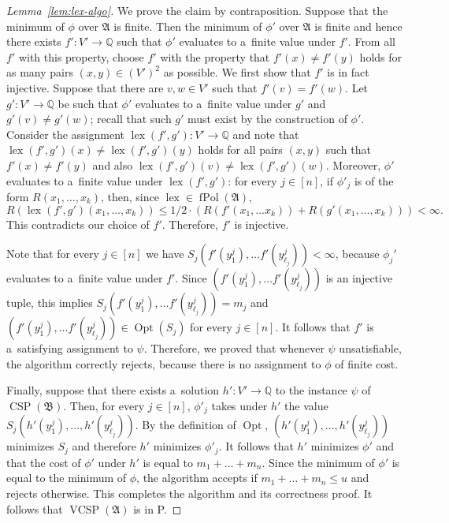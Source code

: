 \documentclass[preprint,12pt]{elsarticle}
\newcommand{\Q}{\mathbb Q}
\newcommand{\bA}{{\mathfrak A}}
\newcommand{\bB}{{\mathfrak B}}
\DeclareMathOperator{\fPol}{fPol}
\DeclareMathOperator{\vcsp}{VCSP}
\DeclareMathOperator{\CSP}{CSP}
\DeclareMathOperator{\Opt}{Opt}
\DeclareMathOperator{\lex}{lex}
\begin{document}
\begin{proof}[Lemma~\ref{lem:lex-algo}]
%
We prove the claim by contraposition. 
%
Suppose that the minimum of $\phi$ over $\bA$ is finite. Then the minimum of $\phi'$ over $\bA$ is finite and hence there exists $f' \colon V' \to \Q$ such that $\phi'$ evaluates to a~finite value under $f'$. From all $f'$ with this property, choose $f'$ with the property that $f'(x)\neq f'(y)$ holds for as many pairs $(x,y) \in (V')^2$ as possible.
%
We first show that $f'$ is in fact injective. Suppose that there are $v, w \in V'$ such that $f'(v)=f'(w)$. Let $g' \colon V' \to \Q$ be such that $\phi'$ evaluates to a~finite value under $g'$ and $g'(v) \neq g'(w)$; recall that such $g'$ must exist by the construction of $\phi'$. Consider the assignment $\lex(f',g') \colon V' \to \Q$ and note that $\lex(f',g')(x) \neq \lex(f',g')(y)$ holds for all pairs $(x,y)$ such that $f'(x) \neq f'(y)$ and also $\lex(f',g')(v) \neq \lex(f',g')(w)$. Moreover, $\phi'$ evaluates to a~finite value under $\lex(f',g')$: for every $j \in [n]$, if $\phi'_j$ is of the form $R(x_1, \dots, x_k)$, then, since $\lex \in \fPol(\bA)$, 
\[R(\lex(f',g')(x_1, \dots, x_k))\leq 1/2 \cdot (R(f'(x_1, \dots x_k))+R(g'(x_1, \dots, x_k))) < \infty.\]
This contradicts our choice of $f'$. Therefore, $f'$ is injective.

Note that for every $j \in [n]$ we have $S_j(f'(y_1^j), \dots f'(y_{\ell_j}^j))<\infty$, because $\phi_j'$ evaluates to a~finite value under $f'$. Since $(f'(y_1^j), \dots f'(y_{\ell_j}^j))$ is an injective tuple, this implies $S_j(f'(y_1^j), \dots f'(y_{\ell_j}^j)) = m_j$ and $(f'(y_1^j), \dots f'(y_{\ell_j}^j)) \in \Opt(S_j)$ for every $j \in [n]$. It follows that $f'$ is a~satisfying assignment to $\psi$. Therefore, we proved that whenever $\psi$ unsatisfiable, the algorithm correctly rejects, because there is no assignment to $\phi$ of finite cost.

Finally, suppose that there exists a~solution $h' \colon V' \to \Q$ to the instance $\psi$ of $\CSP(\bB)$.
Then, for every $j \in [n]$, $\phi'_j$ takes under $h'$ the value $S_j(h'(y_1^j), \dots, h'(y_{\ell_j}^j))$. By the definition of $\Opt$, $(h'(y_1^j), \dots, h'(y_{\ell_j}^j))$ minimizes $S_j$ and therefore $h'$ minimizes $\phi'_j$. It follows that $h'$ minimizes $\phi'$ and that the cost of $\phi'$ under $h'$ is equal to $m_1 + \dots + m_n$. Since the minimum of $\phi'$ is equal to the minimum of $\phi$, the algorithm accepts if %
$m_1 + \dots + m_n \leq u$
and rejects otherwise.
This completes the algorithm and its correctness proof. It follows that $\vcsp(\bA)$ is in P. 
\end{proof}
\end{document}
